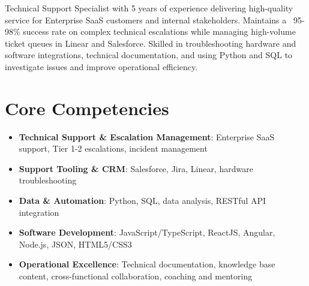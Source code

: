 \documentclass[11pt,a4paper,sans]{moderncv}
\begin{document}
\makecvtitle


\vspace{6pt}
\small{Technical Support Specialist with 5 years of experience delivering high-quality service for Enterprise SaaS customers and internal stakeholders. Maintains a ~95-98\% success rate on complex technical escalations while managing high-volume ticket queues in Linear and Salesforce. Skilled in troubleshooting hardware and software integrations, technical documentation, and using Python and SQL to investigate issues and improve operational efficiency.}


\section{Core Competencies}
\vspace{1pt}
\begin{itemize}

\item \textbf{Technical Support \& Escalation Management}: Enterprise SaaS support, Tier 1-2 escalations, incident management

\item \textbf{Support Tooling \& CRM}: Salesforce, Jira, Linear, hardware troubleshooting

\item \textbf{Data \& Automation}: Python, SQL, data analysis, RESTful API integration

\item \textbf{Software Development}: JavaScript/TypeScript, ReactJS, Angular, Node.js, JSON, HTML5/CSS3

\item \textbf{Operational Excellence}: Technical documentation, knowledge base content, cross-functional collaboration, coaching and mentoring

\end{itemize}

\end{document}
